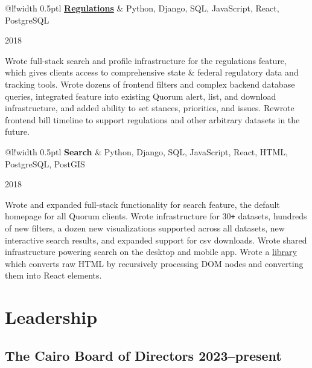 \documentclass[]{article}
\newcommand\VRule{\color{lightgray}\vrule width 0.5pt}
\def\Plus{\texttt{+}}
\begin{document}
\begin{tabular}{@{}l!{\VRule}l}
	{\bf \href{https://www.quorum.us/solutions/regulatory-tracking/}{Regulations}} & Python, Django, SQL, JavaScript, React, PostgreSQL\\
\end{tabular}\hfill{\footnotesize 2018}

Wrote full-stack search and profile infrastructure for the regulations feature, which gives clients access to comprehensive state \& federal regulatory data and tracking tools. Wrote dozens of frontend filters and complex backend database queries, integrated feature into existing Quorum alert, list, and download infrastructure, and added ability to set stances, priorities, and issues. Rewrote frontend bill timeline to support regulations and other arbitrary datasets in the future.\\


\begin{tabular}{@{}l!{\VRule}l}
	{\bf Search} & Python, Django, SQL, JavaScript, React, HTML, PostgreSQL, PostGIS\\
\end{tabular}\hfill{\footnotesize 2018}

Wrote and expanded full-stack functionality for search feature, the default homepage for all Quorum clients. Wrote infrastructure for 30{\Plus} datasets, hundreds of new filters, a dozen new visualizations supported across all datasets, new interactive search results, and expanded support for csv downloads. Wrote shared infrastructure powering search on the desktop and mobile app. Wrote a \href{https://gist.github.com/JohnDDuncanIII/495c10cd461f87c03e292846f6d87078}{library} which converts raw HTML by recursively processing DOM nodes and converting them into React elements.

\section*{Leadership}
\subsection*{The Cairo Board of Directors \hfill \textnormal{\footnotesize{2023--present}}}
\end{document}
